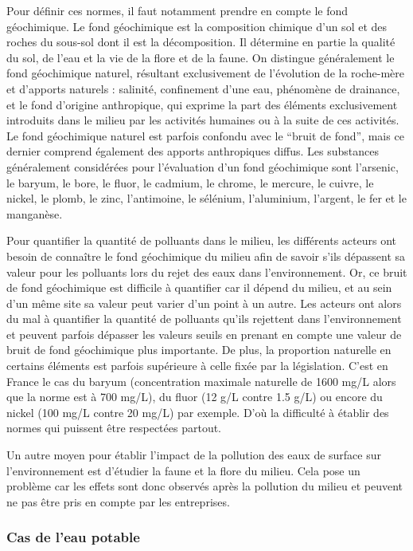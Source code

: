 \documentclass{article}
\begin{document}
Pour définir ces normes, il faut notamment prendre en compte le fond géochimique. Le fond géochimique est la composition chimique d'un sol et des roches du sous-sol dont il est la décomposition. Il détermine en partie la qualité du sol, de l'eau et la vie de la flore et de la faune. On distingue généralement le fond géochimique naturel, résultant exclusivement de l'évolution de la roche-mère et d'apports naturels : salinité, confinement d’une eau, phénomène de drainance, et le fond d'origine anthropique, qui exprime la part des éléments exclusivement introduits dans le milieu par les activités humaines ou à la suite de ces activités. Le fond géochimique naturel est parfois confondu avec le  “bruit de fond”, mais ce dernier comprend également des apports anthropiques diffus. Les substances généralement considérées pour l’évaluation d’un fond géochimique sont  l’arsenic, le baryum, le bore, le fluor, le cadmium, le chrome, le mercure, le cuivre, le nickel, le plomb, le zinc, l’antimoine, le sélénium, l’aluminium, l’argent, le fer et le manganèse.

Pour quantifier la quantité de polluants dans le milieu, les différents acteurs ont besoin de connaître le fond géochimique du milieu afin de savoir s’ils dépassent sa valeur pour les polluants lors du rejet des eaux dans l’environnement. Or, ce bruit de fond géochimique est difficile à quantifier car il dépend du milieu, et au sein d’un même site sa valeur peut varier d’un point à un autre. Les acteurs ont alors du mal à quantifier la quantité de polluants qu’ils rejettent dans l’environnement et peuvent parfois dépasser les valeurs seuils en prenant en compte une valeur de bruit de fond géochimique plus importante. De plus, la proportion naturelle en certains éléments est parfois supérieure à celle fixée par la législation. C’est en France le cas du baryum (concentration maximale naturelle de 1600 mg/L alors que la norme est à 700 mg/L), du fluor (12 g/L contre 1.5 g/L) ou encore du nickel (100 mg/L contre 20 mg/L) par exemple. D’où la difficulté à établir des normes qui puissent être respectées partout. %

Un autre moyen pour établir l’impact de la pollution des eaux de surface sur l’environnement est d’étudier la faune et la flore du milieu. Cela pose un problème car les effets sont donc observés après la pollution du milieu et peuvent ne pas être pris en compte par les entreprises. 

\subsubsection{Cas de l’eau potable} 
\end{document}
